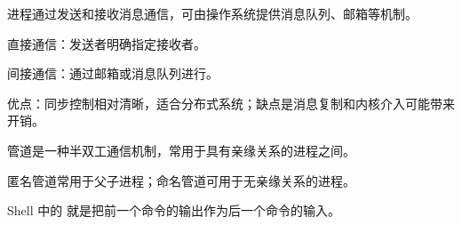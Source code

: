 \begin{points}
  \item 进程通过发送和接收消息通信，可由操作系统提供消息队列、邮箱等机制。
  \item 直接通信：发送者明确指定接收者。
  \item 间接通信：通过邮箱或消息队列进行。
  \item 优点：同步控制相对清晰，适合分布式系统；缺点是消息复制和内核介入可能带来开销。
\end{points}


\begin{points}
  \item 管道是一种半双工通信机制，常用于具有亲缘关系的进程之间。
  \item 匿名管道常用于父子进程；命名管道可用于无亲缘关系的进程。
  \item Shell 中的 \code{|} 就是把前一个命令的输出作为后一个命令的输入。
\end{points}
